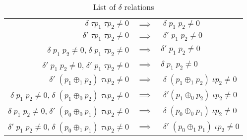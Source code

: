 \documentclass{llncs}
\begin{document}
\begin{table}
\begin{center}
\begin{tabular}{ r c l }
  $\delta \; \tau p_1 \; \tau p_2 \neq 0$
  & $\implies$ & $\; \delta \; p_1 \; p_2 \neq 0$ \\ 
  $\delta' \; \tau p_1 \; \tau p_2 \neq 0$
  & $\implies$ & $\; \delta' \; p_1 \; p_2 \neq 0$ \\ 
  $\delta \; p_1 \; p_2 \neq 0$,$\; \delta \; p_1 \; \tau p_2 \neq 0$
  & $\implies$ & $\delta' \; p_1 \; p_2 \neq 0$ \\ 
  $\delta' \; p_1 \; p_2 \neq 0$,$\; \delta' \; p_1 \; \tau p_2 \neq 0$
  & $\implies$ & $\delta \; p_1 \;p_2 \neq 0$ \\
%  
  \hline
%
  $\delta' \; (p_1 \oplus_1 p_2) \; \tau \iota p_2 \neq 0$
  & $\implies$ & $\; \delta \; (p_1 \oplus_1 p_2) \; \iota p_2 \neq 0$ \\ 
  $\delta \; p_1 \; p_2 \neq 0$,$\; \delta \; (p_1 \oplus_0 p_2) \; \tau \iota p_2 \neq 0$
  & $\implies$ & $\; \delta' (p_1 \oplus_0 p_2) \; \iota p_2 \neq 0$ \\ 
  $\delta \; p_1 \; p_2 \neq 0$,$\; \delta' \; (p_0 \oplus_0 p_1) \; \tau \iota p_2 \neq 0$
  & $\implies$ & $\; \delta \; (p_0 \oplus_0 p_1) \; \iota p_2 \neq 0$ \\ 	    
  $\delta' \; p_1 \; p_2 \neq 0$,$\; \delta \; (p_0 \oplus_1 p_1) \; \tau \iota p_2 \neq 0$
  & $\implies$ & $\; \delta' \; (p_0 \oplus_1 p_1) \; \iota p_2 \neq 0$ \\
\end{tabular}
\end{center}
	\caption{List of $\delta$ relations}
	\label{table:1}
\end{table}
%
\end{document}
